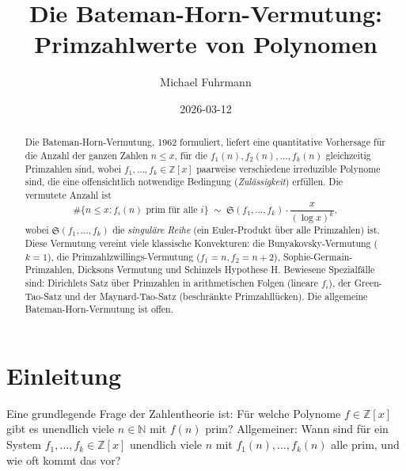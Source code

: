 \documentclass[12pt,a4paper]{amsart}
\theoremstyle{definition}
\theoremstyle{remark}
\newcommand{\Z}{\mathbb{Z}}
\newcommand{\N}{\mathbb{N}}
\newcommand{\BH}{\mathfrak{S}}
\begin{document}

\title{Die Bateman-Horn-Vermutung:\\
  Primzahlwerte von Polynomen}

\author{Michael Fuhrmann}
\address{Specialist Mathematics Project, Build 167}
\date{2026-03-12}

\begin{abstract}
Die Bateman-Horn-Vermutung, 1962 formuliert, liefert eine quantitative Vorhersage für
die Anzahl der ganzen Zahlen $n \leq x$, für die $f_1(n), f_2(n), \ldots, f_k(n)$
gleichzeitig Primzahlen sind, wobei $f_1,\ldots,f_k \in \Z[x]$ paarweise verschiedene
irreduzible Polynome sind, die eine offensichtlich notwendige Bedingung
(\emph{Zulässigkeit}) erfüllen.
Die vermutete Anzahl ist
\[
  \#\{n \leq x : f_i(n) \text{ prim für alle } i\} \;\sim\;
  \BH(f_1,\ldots,f_k) \cdot \frac{x}{(\log x)^k},
\]
wobei $\BH(f_1,\ldots,f_k)$ die \emph{singuläre Reihe} (ein Euler-Produkt über alle
Primzahlen) ist.
Diese Vermutung vereint viele klassische Konvekturen: die Bunyakovsky-Vermutung
($k=1$), die Primzahlzwillings-Vermutung ($f_1 = n, f_2 = n+2$), Sophie-Germain-Primzahlen,
Dicksons Vermutung und Schinzels Hypothese H.
Bewiesene Spezialfälle sind: Dirichlets Satz über Primzahlen in arithmetischen
Folgen (lineare $f_i$), der Green-Tao-Satz und der Maynard-Tao-Satz
(beschränkte Primzahllücken).
Die allgemeine Bateman-Horn-Vermutung ist offen.
\end{abstract}

\maketitle

\tableofcontents

\section{Einleitung}

Eine grundlegende Frage der Zahlentheorie ist: Für welche Polynome $f \in \Z[x]$ gibt
es unendlich viele $n \in \N$ mit $f(n)$ prim? Allgemeiner: Wann sind für ein System
$f_1, \ldots, f_k \in \Z[x]$ unendlich viele $n$ mit $f_1(n),\ldots,f_k(n)$ alle prim,
und wie oft kommt das vor?
\end{document}
